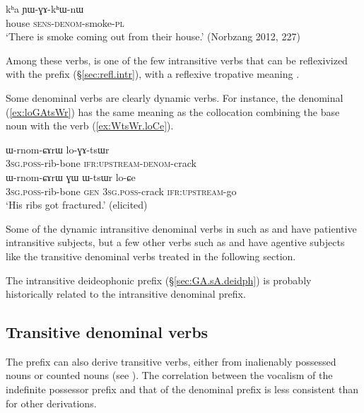 \begin{exe}
\ex \label{ex:kha.YWGAkhWnW}
 \gll  kʰa ɲɯ-ɣɤ-kʰɯ-nɯ \\
 house \textsc{sens}-\textsc{denom}-smoke-\textsc{pl} \\
\glt `There is smoke coming out from their house.' (Norbzang 2012, 227)
\end{exe} 

Among these verbs,  is one of the few intransitive verbs that can be reflexivized with the  prefix (§\ref{sec:refl.intr}), with a reflexive tropative meaning . 

Some  denominal verbs are clearly dynamic verbs. For instance, the denominal  (\ref{ex:loGAtsWr})  has the same meaning as the collocation combining the base noun  with the verb   (\ref{ex:WtsWr.loCe}).

\begin{exe}
\ex 
\begin{xlist}
\ex \label{ex:loGAtsWr}
 \gll ɯ-rnom-ɕɤrɯ lo-ɣɤ-tsɯr \\
\textsc{3sg}.\textsc{poss}-rib-bone  \textsc{ifr}:\textsc{upstream}-\textsc{denom}-crack \\
\ex \label{ex:WtsWr.loCe}
 \gll ɯ-rnom-ɕɤrɯ ɣɯ ɯ-tsɯr lo-ɕe \\
\textsc{3sg}.\textsc{poss}-rib-bone \textsc{gen} \textsc{3sg}.\textsc{poss}-crack  \textsc{ifr}:\textsc{upstream}-go \\
 \glt `His ribs got fractured.' (elicited)
 \end{xlist}
\end{exe} 

Some of the dynamic intransitive denominal verbs in  such as  and  have patientive intransitive subjects, but a few other verbs such as  and  have agentive subjects like the transitive denominal  verbs treated in the following section.

The intransitive deideophonic  prefix (§\ref{sec:GA.sA.deidph}) is probably historically related to the  intransitive denominal prefix.

\subsection{Transitive  denominal verbs}   \label{sec:denom.tr.GA}
The  prefix can also derive transitive verbs,  either from inalienably possessed nouns or counted nouns (see ). The correlation between the  vocalism of the indefinite possessor prefix  and that of the denominal prefix   is less consistent than for other derivations. 
 
